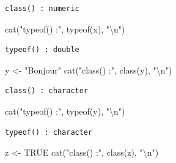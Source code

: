 \documentclass[
  french,
  11pt,
  a4paper,
]{article}
\newenvironment{Shaded}{}{}
\newcommand{\ConstantTok}[1]{\textcolor[rgb]{0.00,0.36,0.77}{#1}}
\newcommand{\FunctionTok}[1]{\textcolor[rgb]{0.44,0.26,0.76}{#1}}
\newcommand{\NormalTok}[1]{\textcolor[rgb]{0.14,0.16,0.18}{#1}}
\newcommand{\OtherTok}[1]{\textcolor[rgb]{0.44,0.26,0.76}{#1}}
\newcommand{\SpecialCharTok}[1]{\textcolor[rgb]{0.00,0.36,0.77}{#1}}
\newcommand{\StringTok}[1]{\textcolor[rgb]{0.01,0.18,0.38}{#1}}
\begin{document}
\begin{verbatim}
class() : numeric 
\end{verbatim}

\begin{Shaded}
\begin{Highlighting}[]
\FunctionTok{cat}\NormalTok{(}\StringTok{"typeof() :"}\NormalTok{, }\FunctionTok{typeof}\NormalTok{(x), }\StringTok{"}\SpecialCharTok{\textbackslash{}n}\StringTok{"}\NormalTok{)}
\end{Highlighting}
\end{Shaded}

\begin{verbatim}
typeof() : double 
\end{verbatim}

\begin{Shaded}
\begin{Highlighting}[]
\NormalTok{y }\OtherTok{\textless{}{-}} \StringTok{"Bonjour"}
\FunctionTok{cat}\NormalTok{(}\StringTok{"class() :"}\NormalTok{, }\FunctionTok{class}\NormalTok{(y), }\StringTok{"}\SpecialCharTok{\textbackslash{}n}\StringTok{"}\NormalTok{)}
\end{Highlighting}
\end{Shaded}

\begin{verbatim}
class() : character 
\end{verbatim}

\begin{Shaded}
\begin{Highlighting}[]
\FunctionTok{cat}\NormalTok{(}\StringTok{"typeof() :"}\NormalTok{, }\FunctionTok{typeof}\NormalTok{(y), }\StringTok{"}\SpecialCharTok{\textbackslash{}n}\StringTok{"}\NormalTok{)}
\end{Highlighting}
\end{Shaded}

\begin{verbatim}
typeof() : character 
\end{verbatim}

\begin{Shaded}
\begin{Highlighting}[]
\NormalTok{z }\OtherTok{\textless{}{-}} \ConstantTok{TRUE}
\FunctionTok{cat}\NormalTok{(}\StringTok{"class() :"}\NormalTok{, }\FunctionTok{class}\NormalTok{(z), }\StringTok{"}\SpecialCharTok{\textbackslash{}n}\StringTok{"}\NormalTok{)}
\end{Highlighting}
\end{Shaded}
\end{document}
